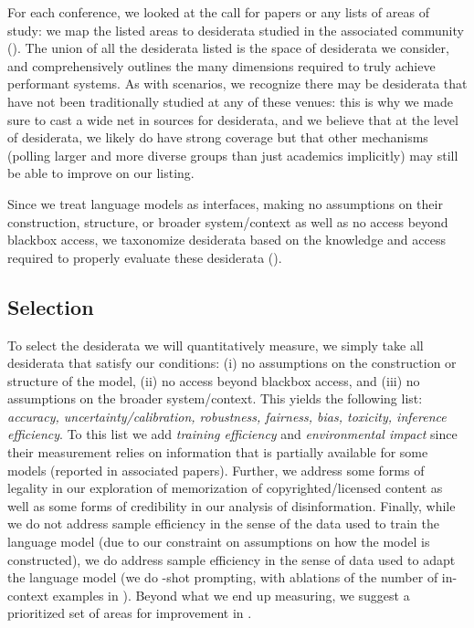 

For each conference, we looked at the call for papers or any lists of areas of study: we map the listed areas to desiderata studied in the associated community ().
The union of all the desiderata listed is the space of desiderata we consider, and comprehensively outlines the many dimensions required to truly achieve performant systems.
As with scenarios, we recognize there may be desiderata that have not been traditionally studied at any of these venues: this is why we made sure to cast a wide net in sources for desiderata, and we believe that at the level of desiderata, we likely do have strong coverage but that other mechanisms (\eg polling larger and more diverse groups than just academics implicitly) may still be able to improve on our listing. 

Since we treat language models as interfaces, making no assumptions on their construction, structure, or broader system/context as well as no access beyond blackbox access, we taxonomize desiderata based on the knowledge and access required to properly evaluate these desiderata ().

\hypertarget{metric-selection}{\subsection{Selection}}
\label{sec:metrics-selection}

To select the desiderata we will quantitatively measure, we simply take all desiderata that satisfy our conditions:
(i) no assumptions on the construction or structure of the model,
(ii) no access beyond blackbox access,
and (iii) no assumptions on the broader system/context.
This yields the following list: 
\textit{accuracy, 
uncertainty/calibration, 
robustness, 
fairness, 
bias, 
toxicity, 
inference efficiency}.
To this list we add \textit{training efficiency} and \textit{environmental impact} since their measurement relies on information that is partially available for some models (\ie reported in associated papers).
Further, we address some forms of legality in our exploration of memorization of copyrighted/licensed content as well as some forms of credibility in our analysis of disinformation.
Finally, while we do not address sample efficiency in the sense of the data used to train the language model (due to our constraint on assumptions on how the model is constructed), we do address sample efficiency in the sense of data used to adapt the language model (we do \numincontext-shot prompting, with ablations of the number of in-context examples in ).
Beyond what we end up measuring, we suggest a prioritized set of areas for improvement in . 

